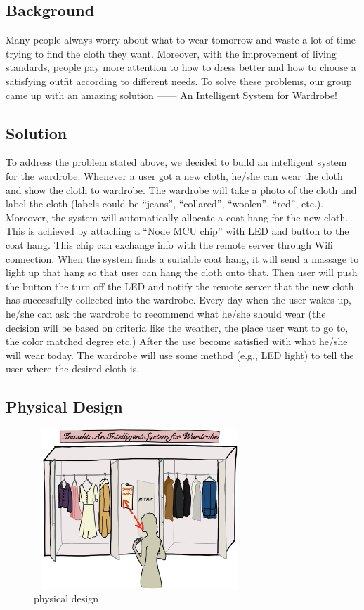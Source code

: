 \subsection{Background}  
Many people always worry about what to wear tomorrow and waste a lot of time trying to find the cloth they want. Moreover, with the improvement of living standards, people pay more attention to how to dress better and how to choose a satisfying outfit according to different needs. To solve these problems, our group came up with an amazing solution —— An Intelligent System for Wardrobe! 

\subsection{Solution}
To address the problem stated above, we decided to build an intelligent system for the wardrobe. Whenever a user got a new cloth, he/she can wear the cloth and show the cloth to wardrobe. The wardrobe will take a photo of the cloth and label the cloth (labels could be “jeans”, “collared”, “woolen”, “red”, etc.). Moreover, the system will automatically allocate a coat hang for the new cloth. This is achieved by attaching a “Node MCU chip” with LED and button to the coat hang. This chip can exchange info with the remote server through Wifi connection. When the system finds a suitable coat hang, it will send a massage to light up that hang so that user can hang the cloth onto that. Then user will push the button the turn off the LED and notify the remote server that the new cloth has successfully collected into the wardrobe. Every day when the user wakes up, he/she can ask the wardrobe to recommend what he/she should wear (the decision will be based on criteria like the weather, the place user want to go to, the color matched degree etc.) After the use become satisfied with what he/she will wear today. The wardrobe will use some method (e.g., LED light) to tell the user where the desired cloth is.

\subsection{Physical Design}

\begin{figure}[h]
   \centering
   \includegraphics[width=8cm,height=6cm]{graph/physical design.jpg}
   \caption{physical design}
   \end{figure}

